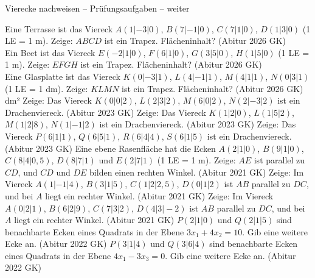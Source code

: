 \begin{aufgabe}{Vierecke nachweisen – Prüfungsaufgaben – weiter}
\begin{teile}
\teil Eine Terrasse ist das Viereck $A(1 | -3 | 0)$, $B(7 | -1 | 0)$, $C(7 | 1 | 0)$, $D(1 | 3 | 0)$ (1 LE = 1 m). Zeige: $ABCD$ ist ein Trapez. Flächeninhalt? \hfill (Abitur 2026 GK) \\ \leerfeld[m²]
\teil Ein Beet ist das Viereck $E(-2 | 1 | 0)$, $F(6 | 1 | 0)$, $G(3 | 5 | 0)$, $H(1 | 5 | 0)$ (1 LE = 1 m). Zeige: $EFGH$ ist ein Trapez. Flächeninhalt? \hfill (Abitur 2026 GK) \\ \leerfeld[m²]
\teil Eine Glasplatte ist das Viereck $K(0 | -3 | 1)$, $L(4 | -1 | 1)$, $M(4 | 1 | 1)$, $N(0 | 3 | 1)$ (1 LE = 1 dm). Zeige: $KLMN$ ist ein Trapez. Flächeninhalt? \hfill (Abitur 2026 GK) \\ \leerfeld dm²
\teil Zeige: Das Viereck $K(0 | 0 | 2)$, $L(2 | 3 | 2)$, $M(6 | 0 | 2)$, $N(2 | -3 | 2)$ ist ein Drachenviereck. \hfill (Abitur 2023 GK)
\teil Zeige: Das Viereck $K(1 | 2 | 0)$, $L(1 | 5 | 2)$, $M(1 | 2 | 8)$, $N(1 | -1 | 2)$ ist ein Drachenviereck. \hfill (Abitur 2023 GK)
\teil Zeige: Das Viereck $P(6 | 1 | 1)$, $Q(6 | 5 | 1)$, $R(6 | 4 | 4)$, $S(6 | 1 | 5)$ ist ein Drachenviereck. \hfill (Abitur 2023 GK)
\teil Eine ebene Rasenfläche hat die Ecken $A(2 | 1 | 0)$, $B(9 | 1 | 0)$, $C(8 | 4 | 0{,}5)$, $D(8 | 7 | 1)$ und $E(2 | 7 | 1)$ (1 LE = 1 m). Zeige: $AE$ ist parallel zu $CD$, und $CD$ und $DE$ bilden einen rechten Winkel. \hfill (Abitur 2021 GK)
\teil Zeige: Im Viereck $A(1 | -1 | 4)$, $B(3 | 1 | 5)$, $C(1 | 2 | 2{,}5)$, $D(0 | 1 | 2)$ ist $AB$ parallel zu $DC$, und bei $A$ liegt ein rechter Winkel. \hfill (Abitur 2021 GK)
\teil Zeige: Im Viereck $A(0 | 2 | 1)$, $B(6 | 2 | 9)$, $C(7 | 3 | 2)$, $D(4 | 3 | -2)$ ist $AB$ parallel zu $DC$, und bei $A$ liegt ein rechter Winkel. \hfill (Abitur 2021 GK)
\teil $P(2 | 1 | 0)$ und $Q(2 | 1 | 5)$ sind benachbarte Ecken eines Quadrats in der Ebene $3x_1 + 4x_2 = 10$. Gib eine weitere Ecke an. \hfill (Abitur 2022 GK)
\teil $P(3 | 1 | 4)$ und $Q(3 | 6 | 4)$ sind benachbarte Ecken eines Quadrats in der Ebene $4x_1 - 3x_3 = 0$. Gib eine weitere Ecke an. \hfill (Abitur 2022 GK)
\end{teile}
\end{aufgabe}

